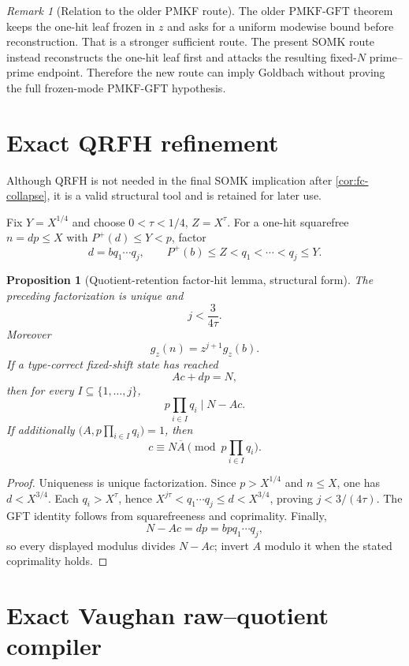 \documentclass[11pt]{article}
\newtheorem{proposition}[theorem]{Proposition}
\theoremstyle{definition}
\theoremstyle{remark}
\newtheorem{remark}[theorem]{Remark}
\newcommand{\1}{\mathbf 1}
\newcommand{\PMKF}{\mathrm{PMKF}\text{-}\mathrm{GFT}}
\begin{document}
\begin{remark}[Relation to the older PMKF route]
The older \(\PMKF\) theorem keeps the one-hit leaf frozen in \(z\) and asks for a uniform modewise bound before reconstruction.  That is a stronger sufficient route.  The present SOMK route instead reconstructs the one-hit leaf first and attacks the resulting fixed-\(N\) prime--prime endpoint.  Therefore the new route can imply Goldbach without proving the full frozen-mode \(\PMKF\) hypothesis.
\end{remark}

\section{Exact QRFH refinement}\label{sec:qrfh}

Although QRFH is not needed in the final SOMK implication after \cref{cor:fc-collapse}, it is a valid structural tool and is retained for later use.

Fix \(Y=X^{1/4}\) and choose \(0<\tau<1/4\), \(Z=X^\tau\).  For a one-hit squarefree \(n=dp\le X\) with \(P^+(d)\le Y<p\), factor
\[
 d=bq_1\cdots q_j,
 \qquad
 P^+(b)\le Z<q_1<\cdots<q_j\le Y.
\]

\begin{proposition}[Quotient-retention factor-hit lemma, structural form]\label{prop:qrfh}
The preceding factorization is unique and
\[
 j<\frac{3}{4\tau}.
\]
Moreover
\[
 g_z(n)=z^{j+1}g_z(b).
\]
If a type-correct fixed-shift state has reached
\[
 Ac+dp=N,
\]
then for every \(I\subseteq\{1,\dots,j\}\),
\[
 p\prod_{i\in I}q_i\mid N-Ac.
\]
If additionally \(\bigl(A,p\prod_{i\in I}q_i\bigr)=1\), then
\[
 c\equiv N\overline A\pmod{p\prod_{i\in I}q_i}.
\]
\end{proposition}

\begin{proof}
Uniqueness is unique factorization.  Since \(p>X^{1/4}\) and \(n\le X\), one has \(d<X^{3/4}\).  Each \(q_i>X^\tau\), hence \(X^{j\tau}<q_1\cdots q_j\le d<X^{3/4}\), proving \(j<3/(4\tau)\).  The GFT identity follows from squarefreeness and coprimality.  Finally,
\[
 N-Ac=dp=bpq_1\cdots q_j,
\]
so every displayed modulus divides \(N-Ac\); invert \(A\) modulo it when the stated coprimality holds.
\end{proof}

\section{Exact Vaughan raw--quotient compiler}\label{sec:vaughan}
\end{document}
